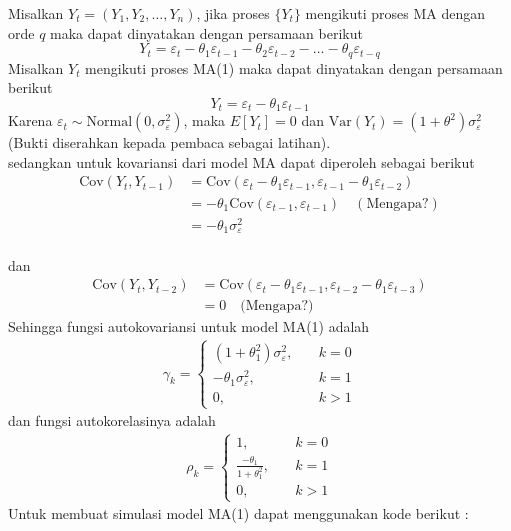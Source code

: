 \documentclass[
]{book}
\begin{document}
Misalkan \(Y_t=(Y_1,Y_2,…,Y_n )\), jika proses \(\{Y_t\}\) mengikuti proses MA dengan orde \(q\) maka dapat dinyatakan dengan persamaan berikut
\begin{equation}
Y_t=\varepsilon_t - \theta_1 \varepsilon_{t-1}-\theta_2 \varepsilon_{t-2}-\dots-\theta_q \varepsilon_{t-q}
\end{equation}
Misalkan \(Y_t\) mengikuti proses MA(1) maka dapat dinyatakan dengan persamaan berikut
\begin{equation}
Y_t=\varepsilon_t - \theta_1 \varepsilon_{t-1}
\end{equation}
Karena \(\varepsilon_t\sim \text{Normal}(0,\sigma^2_\varepsilon)\), maka \(E[Y_t]=0\) dan \(\text{Var}(Y_t)=(1+\theta^2)\sigma_\varepsilon^2\) (Bukti diserahkan kepada pembaca sebagai latihan).\\
sedangkan untuk kovariansi dari model MA dapat diperoleh sebagai berikut\\
\begin{align*}
\text{Cov}(Y_t,Y_{t-1}) &=\text{Cov}(\varepsilon_t-\theta_1 \varepsilon_{t-1}, \varepsilon_{t-1}-\theta_1 \varepsilon_{t-2}) \\
&=-\theta_1 \text{Cov}(\varepsilon_{t-1},\varepsilon_{t-1}) \quad (\text{Mengapa?}) \\
&=-\theta_1 \sigma_\varepsilon^2
\end{align*}\\
dan
\begin{align*}
\text{Cov}(Y_t,Y_{t-2})&=\text{Cov}(\varepsilon_t - \theta_1 \varepsilon_{t-1},\varepsilon_{t-2}-\theta_1\varepsilon_{t-3}) \\ 
&= 0 \quad \text{(Mengapa?)}
\end{align*}
Sehingga fungsi autokovariansi untuk model MA(1) adalah
\begin{align*}
\gamma_k = \begin{cases}
(1+\theta_1^2)\sigma^2_\varepsilon, \quad &k =0 \\
-\theta_1 \sigma^2_\varepsilon, \quad &k = 1 \\ 
0, \quad &k > 1
\end{cases}
\end{align*}
dan fungsi autokorelasinya adalah
\begin{align*}
\rho_k = \begin{cases}
1, \quad &k =0 \\
\frac{-\theta_1}{1+\theta^2_1}, \quad &k = 1 \\ 
0, \quad &k >1
\end{cases}
\end{align*}
Untuk membuat simulasi model MA(1) dapat menggunakan kode berikut :
\end{document}
